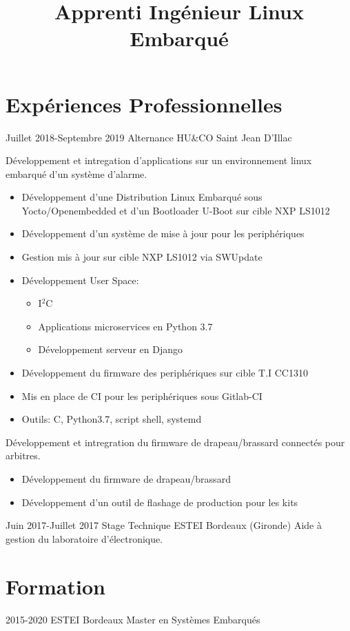 \documentclass[9pts,a4paper,sans]{moderncv}
\title{Apprenti Ingénieur Linux Embarqué }
\begin{document}
\maketitle

\section{Expériences Professionnelles}
\cventry{} {Juillet 2018-Septembre 2019} {Alternance} {HU\&CO} {Saint Jean D'Illac} {
	Développement et intregation d'applications sur un environnement linux embarqué d'un système d'alarme.
	\begin{itemize}
		\item Développement d'une Distribution Linux Embarqué sous Yocto/Openembedded et d'un Bootloader U-Boot sur cible NXP LS1012
		\item Développement d'un système de mise à jour pour les periphériques
		\item Gestion mis à jour sur cible NXP LS1012 via SWUpdate 
		\item Développement User Space:
		\begin{itemize}
			\item I$^{2}$C
			\item Applications microservices en Python 3.7
			\item Développement serveur en Django
		\end{itemize}
		\item Développement du firmware des periphériques sur cible T.I CC1310
		\item Mis en place de CI pour les periphériques sous Gitlab-CI 
		\item Outils: C, Python3.7, script shell, systemd 
	\end{itemize}
	Développement et intregration du firmware de drapeau/brassard connectés pour arbitres.
	\begin{itemize}
		\item Développement du firmware de drapeau/brassard
		\item Développement d'un outil de flashage de production pour les kits
	\end{itemize}
}

\cventry{} {Juin 2017-Juillet 2017} {Stage Technique} {ESTEI} {Bordeaux (Gironde)} {Aide à gestion du laboratoire d’électronique.} {}
{} {}

\section{Formation}
\cventry{} {2015-2020} {ESTEI} {Bordeaux} {Master en Systèmes Embarqués} {}
\end{document}

